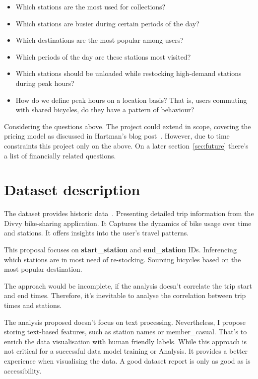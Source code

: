 \documentclass[12pt, a4paper]{article}
\begin{document}
    \begin{itemize}
        \item Which stations are the most used for collections?
        \item Which stations are busier during certain periods of the day?
        \item Which destinations are the most popular among users?
        \item Which periods of the day are these stations most visited?
        \item Which stations should be unloaded while restocking high-demand stations during peak hours?
        \item How do we define peak hours on a location basis? That is, users commuting with shared bicycles, do they have a pattern of behaviour?
    \end{itemize}

	Considering the questions above.
	The project could extend in scope, covering the pricing model as discussed in Hartman's blog post~\cite{Hartman2021}.
	However, due to time constraints this project only on the above. On a later section~\ref{sec:future} there's a list of financially related questions.

    \section*{Dataset description}
    \label{sec:dataset}

    The dataset provides historic data~\cite{DataIndex}. Presenting detailed trip information from the Divvy bike-sharing application.\newline
    It Captures the dynamics of bike usage over time and stations. It offers insights into the user's travel patterns.\newline

    This proposal focuses on \textbf{start\_station} and \textbf{end\_station} IDs. Inferencing which stations are in most need of re-stocking.
    Sourcing bicycles based on the most popular destination.\newline

    The approach would be incomplete, if the analysis doesn't correlate the trip start and end times.
    Therefore, it's inevitable to analyse the correlation between trip times and stations.\newline

    The analysis proposed doesn't focus on text processing. Nevertheless, I propose storing text-based features, such as station names or member\_casual.
    That's to enrich the data visualisation with human friendly labels.\newline
    While this approach is not critical for a successful data model training or Analysis.
    It provides a better experience when visualising the data.\newline
    A good dataset report is only as good as is accessibility.
\end{document}
